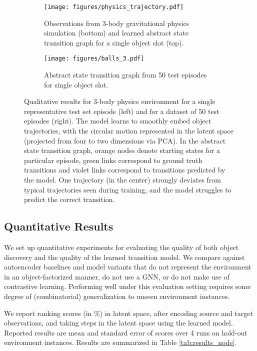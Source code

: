 \documentclass{article} %
\begin{document}
\begin{figure*}[t]
\centering
  \begin{subfigure}[b]{0.59\textwidth}
    \centering
    \texttt{[image: figures/physics\_trajectory.pdf]}
    \caption{Observations from 3-body gravitational physics simulation (bottom) and learned abstract state transition graph for a single object slot (top).}
  \end{subfigure}
  \quad
  \begin{subfigure}[b]{0.35\textwidth}
    \centering
    \texttt{[image: figures/balls\_3.pdf]}
    \centering
    \caption{Abstract state transition graph from 50 test episodes for single object slot.}
  \end{subfigure}
  \caption{Qualitative results for 3-body physics environment for a single representative test set episode (left) and for a dataset of 50 test episodes (right). The model learns to smoothly embed object trajectories, with the circular motion represented in the latent space (projected from four to two dimensions via PCA). In the abstract state transition graph, orange nodes denote starting states for a particular episode, green links correspond to ground truth transitions and violet links correspond to transitions predicted by the model. One trajectory (in the center) strongly deviates from typical trajectories seen during training, and the model struggles to predict the correct transition.\label{fig:physics}}
\end{figure*}

\subsection{Quantitative Results}
We set up quantitative experiments for evaluating the quality of both object discovery and the quality of the learned transition model. We compare against autoencoder baselines and model variants that do not represent the environment in an object-factorized manner, do not use a GNN, or do not make use of contrastive learning. Performing well under this evaluation setting requires some degree of (combinatorial) generalization to unseen environment instances.

We report ranking scores (in \%) in latent space, after encoding source and target observations, and taking steps in the latent space using the learned model. Reported results are mean and standard error of scores over 4 runs on hold-out environment instances. Results are summarized in Table \ref{tab:results_node}.
\end{document}

